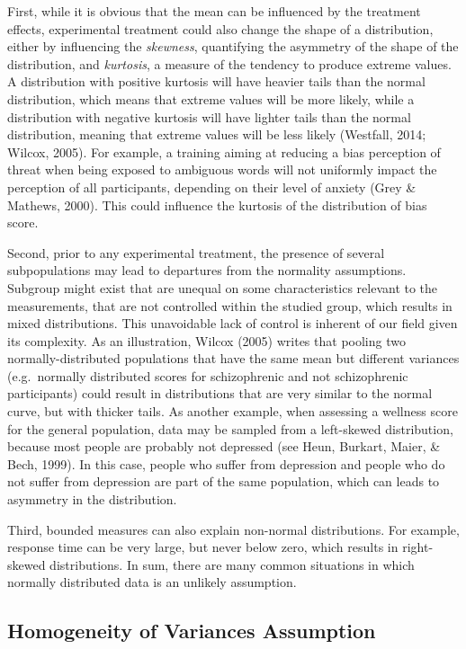 \documentclass[man,floatsintext]{apa6}
\begin{document}
First, while it is obvious that the mean can be influenced by the treatment effects, experimental treatment could also change the shape of a distribution, either by influencing the \emph{skewness}, quantifying the asymmetry of the shape of the distribution, and \emph{kurtosis}, a measure of the tendency to produce extreme values. A distribution with positive kurtosis will have heavier tails than the normal distribution, which means that extreme values will be more likely, while a distribution with negative kurtosis will have lighter tails than the normal distribution, meaning that extreme values will be less likely (Westfall, 2014; Wilcox, 2005). For example, a training aiming at reducing a bias perception of threat when being exposed to ambiguous words will not uniformly impact the perception of all participants, depending on their level of anxiety (Grey \& Mathews, 2000). This could influence the kurtosis of the distribution of bias score.

Second, prior to any experimental treatment, the presence of several subpopulations may lead to departures from the normality assumptions. Subgroup might exist that are unequal on some characteristics relevant to the measurements, that are not controlled within the studied group, which results in mixed distributions. This unavoidable lack of control is inherent of our field given its complexity. As an illustration, Wilcox (2005) writes that pooling two normally-distributed populations that have the same mean but different variances (e.g.~normally distributed scores for schizophrenic and not schizophrenic participants) could result in distributions that are very similar to the normal curve, but with thicker tails. As another example, when assessing a wellness score for the general population, data may be sampled from a left-skewed distribution, because most people are probably not depressed (see Heun, Burkart, Maier, \& Bech, 1999). In this case, people who suffer from depression and people who do not suffer from depression are part of the same population, which can leads to asymmetry in the distribution.

Third, bounded measures can also explain non-normal distributions. For example, response time can be very large, but never below zero, which results in right-skewed distributions. In sum, there are many common situations in which normally distributed data is an unlikely assumption.

\hypertarget{homogeneity-of-variances-assumption}{%
\subsection{Homogeneity of Variances Assumption}\label{homogeneity-of-variances-assumption}}
\end{document}
